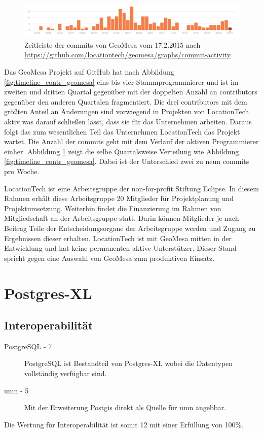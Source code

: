 \begin{figure}[h!]
\centering
\includegraphics[width=\textwidth]{Abbildungen/geomesa_timeline_commits.png}
\caption[Zeitleiste der commits von GeoMesa]{Zeitleiste der commits von GeoMesa vom 17.2.2015 nach \url{https://github.com/locationtech/geomesa/graphs/commit-activity}}
\label{fig:timeline_commits_geomesa}
\end{figure}
Das GeoMesa Projekt auf GitHub hat nach Abbildung \ref{fig:timeline_contr_geomesa} eins bis vier Stammprogrammierer und ist im zweiten und dritten Quartal gegenüber mit der doppelten Anzahl an contributors gegenüber den anderen Quartalen fragmentiert.
Die drei contributors mit dem größten Anteil an Änderungen sind vorwiegend in Projekten von LocationTech aktiv was darauf schließen lässt, dass sie für das Unternehmen arbeiten.
Daraus folgt das zum wesentlichen Teil das Unternehmen LocationTech das Projekt wartet.
Die Anzahl der commits geht mit dem Verlauf der aktiven Programmierer einher.
Abbildung \ref{fig:timeline_commits_geomesa} zeigt die selbe Quartalsweise Verteilung wie Abbildung \ref{fig:timeline_contr_geomesa}.
Dabei ist der Unterschied zwei zu neun commits pro Woche.

LocationTech ist eine Arbeitsgruppe der non-for-profit Stiftung Eclipse.
In diesem Rahmen erhält diese Arbeitsgruppe 20 Mitglieder für Projektplanung und Projektumsetzung.
Weiterhin findet die Finanzierung im Rahmen von Mitgliedschaft an der Arbeitsgruppe statt.
Darin können Mitglieder je nach Beitrag Teile der Entscheidungsorgane der Arbeitsgruppe werden und Zugang zu Ergebnissen dieser erhalten. \cite{website:locationtech-about}
LocationTech ist mit GeoMesa mitten in der Entwicklung und hat keine permanenten aktive Unterstützer.
Dieser Stand spricht gegen eine Auswahl von GeoMesa zum produktiven Einsatz.

\section{Postgres-XL}

\subsection{Interoperabilität}
\begin{description}
\item[PostgreSQL - 7] PostgreSQL ist Bestandteil von Postgres-XL wobei die Datentypen vollständig verfügbar sind.
\item[\Gls{umn} - 5] Mit der Erweiterung Postgis direkt als Quelle für \Gls{umn} angebbar. \cite{website:umn-layer}
\end{description}
Die Wertung für Interoperabilität ist somit 12 mit einer Erfüllung von 100\%.


